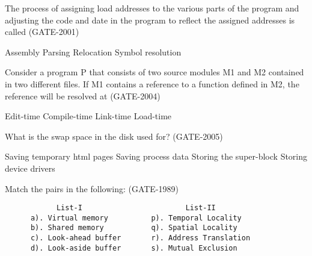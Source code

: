 
\begin{questyle}

  \question  The process of assigning load addresses to the various parts of the program and adjusting the code and date in the program to reflect the assigned addresses is called (GATE-2001)

  \begin{oneparchoices}
    \choice Assembly
    \choice Parsing
    \choice Relocation
    \choice Symbol resolution
  \end{oneparchoices}

\end{questyle}


\begin{questyle}

  \question  Consider a program P that consists of two source modules M1 and M2 contained in two different files. If M1 contains a reference to a function defined in M2, the reference will be resolved at (GATE-2004)

  \begin{oneparchoices}
    \choice Edit-time
    \choice Compile-time
    \choice Link-time
    \choice Load-time
  \end{oneparchoices}

\end{questyle}


\begin{questyle}

  \question  What is the swap space in the disk used for? (GATE-2005)

  \begin{choices}
    \choice Saving temporary html pages
    \choice Saving process data
    \choice Storing the super-block
    \choice Storing device drivers
  \end{choices}

\end{questyle}


\begin{questyle}

  \question Match the pairs in the following: (GATE-1989)

  \begin{lstlisting}
            List-I                        List-II
      a). Virtual memory          p). Temporal Locality
      b). Shared memory           q). Spatial Locality
      c). Look-ahead buffer       r). Address Translation
      d). Look-aside buffer       s). Mutual Exclusion

  \end{lstlisting}


\end{questyle}

